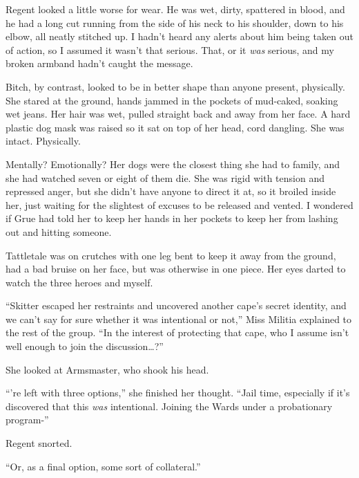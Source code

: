 Regent looked a little worse for wear.  He was wet, dirty, spattered in blood, and he had a long cut running from the side of his neck to his shoulder, down to his elbow, all neatly stitched up.  I hadn't heard any alerts about him being taken out of action, so I assumed it wasn't that serious.  That, or it \emph{was} serious, and my broken armband hadn't caught the message.



Bitch, by contrast, looked to be in better shape than anyone present, physically.  She stared at the ground, hands jammed in the pockets of mud-caked, soaking wet jeans.  Her hair was wet, pulled straight back and away from her face.  A hard plastic dog mask was raised so it sat on top of her head, cord dangling.  She was intact.  Physically.



Mentally?  Emotionally?  Her dogs were the closest thing she had to family, and she had watched seven or eight of them die.  She was rigid with tension and repressed anger, but she didn't have anyone to direct it at, so it broiled inside her, just waiting for the slightest of excuses to be released and vented.  I wondered if Grue had told her to keep her hands in her pockets to keep her from lashing out and hitting someone.



Tattletale was on crutches with one leg bent to keep it away from the ground, had a bad bruise on her face, but was otherwise in one piece.  Her eyes darted to watch the three heroes and myself.



``Skitter escaped her restraints and uncovered another cape's secret identity, and we can't say for sure whether it was intentional or not,'' Miss Militia explained to the rest of the group.  ``In the interest of protecting that cape, who I assume isn't well enough to join the discussion\ldots?''



She looked at Armsmaster, who shook his head.



``\ldotsWe're left with three options,'' she finished her thought.  ``Jail time, especially if it's discovered that this \emph{was} intentional.  Joining the Wards under a probationary program-''



Regent snorted.



``Or, as a final option, some sort of collateral.''



